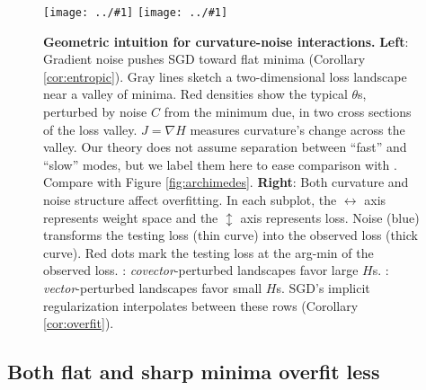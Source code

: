 \documentclass[anon,12pt]{colt2021} %
\newcommand{\offive}[1]{
    {\tiny
        \raisebox{-0.04cm}{\color{gray}\scalebox{2.5}{$\substack{
            \ifthenelse{\equal{#1}{0}}{{\color{moor}\blacksquare}}{\square} 
        }$}}%
        \raisebox{0.04cm}{$\substack{
            \IfSubStr{#1}{1}{{\color{moor}\blacksquare}}{\square}   
            \IfSubStr{#1}{1}{{\color{moor}\blacksquare}}{\square} \\
            \IfSubStr{#1}{2}{{\color{moor}\blacksquare}}{\square}    
            \IfSubStr{#1}{2}{{\color{moor}\blacksquare}}{\square}    
        }$}%
    }%
}
\newcommand{\plotmooh}[3]{\texttt{[image: ../\#1]}}
\begin{document}
            \begin{figure}[h!]
                \centering
                \plotmooh{colt/cubic}{}{0.35\columnwidth}
                \hfill  
                \plotmooh{colt/spring}{}{0.35\columnwidth}
                \caption{%
                    \textbf{Geometric intuition for curvature-noise interactions.}
                    \textbf{Left}:
                        Gradient noise pushes SGD toward flat minima
                        (Corollary
                        \ref{cor:entropic}).
                        Gray lines sketch a two-dimensional loss landscape near
                        a valley of minima.
                        Red densities show the 
                        typical $\theta$s, perturbed by noise $C$ from the
                        minimum due, in two cross sections of the
                        loss valley.  $J = \nabla H$ measures
                        curvature's change across the valley.  Our theory
                        does not assume separation between ``fast'' and
                        ``slow'' modes, but we label them here to
                        ease comparison with \cite{we19b}.
                        Compare with Figure \ref{fig:archimedes}.
                    \textbf{\bf Right}:
                        Both curvature and noise structure affect overfitting.
                        In each subplot, the  $\leftrightarrow$
                        axis represents weight space and the $\updownarrow$
                        axis represents loss.  Noise (blue) transforms
                        the testing loss (thin curve) into the observed loss
                        (thick curve).  Red dots mark the testing loss at the
                        arg-min of the observed loss.  \protect\offive{1}:
                        \emph{covector}-perturbed landscapes favor large $H$s.
                        \protect\offive{2}: \emph{vector}-perturbed landscapes
                        favor small $H$s.  SGD's implicit regularization
                        interpolates between these rows (Corollary
                        \ref{cor:overfit}).
                }
                \label{fig:cubicandspring}
            \end{figure}



        \subsection{Both flat and sharp minima overfit less}
            \label{subsect:curvature-and-overfitting}%
\end{document}
